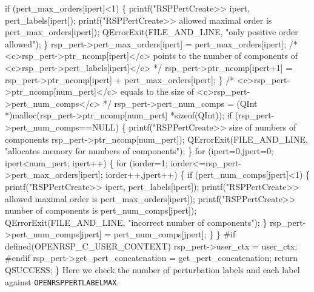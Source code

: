         if (pert_max_orders[ipert]<1) \{
            printf("RSPPertCreate>> %
                   ipert,
                   pert_labels[ipert]);
            printf("RSPPertCreate>> allowed maximal order is %
                   pert_max_orders[ipert]);
            QErrorExit(FILE_AND_LINE, "only positive order allowed");
        \}
        rsp_pert->pert_max_orders[ipert] = pert_max_orders[ipert];
        /* <c>rsp_pert->ptr_ncomp[ipert]</c> points to the number of components
           of <c>rsp_pert->pert_labels[ipert]</c> */
        rsp_pert->ptr_ncomp[ipert+1] = rsp_pert->ptr_ncomp[ipert]
                                     + pert_max_orders[ipert];
    \}
    /* <c>rsp_pert->ptr_ncomp[num_pert]</c> equals to the size of
       <c>rsp_pert->pert_num_comps</c> */
    rsp_pert->pert_num_comps = (QInt *)malloc(rsp_pert->ptr_ncomp[num_pert]
                                              *sizeof(QInt));
    if (rsp_pert->pert_num_comps==NULL) \{
        printf("RSPPertCreate>> size of numbers of components %
               rsp_pert->ptr_ncomp[num_pert]);
        QErrorExit(FILE_AND_LINE, "allocates memory for numbers of components");
    \}
    for (ipert=0,jpert=0; ipert<num_pert; ipert++) \{
        for (iorder=1; iorder<=rsp_pert->pert_max_orders[ipert]; iorder++,jpert++) \{
            if (pert_num_comps[jpert]<1) \{
                printf("RSPPertCreate>> %
                       ipert,
                       pert_labels[ipert]);
                printf("RSPPertCreate>> allowed maximal order is %
                       pert_max_orders[ipert]);
                printf("RSPPertCreate>> number of components is %
                       pert_num_comps[jpert]);
                QErrorExit(FILE_AND_LINE, "incorrect number of components");
            \}
            rsp_pert->pert_num_comps[jpert] = pert_num_comps[jpert];
        \}
    \}
#if defined(OPENRSP_C_USER_CONTEXT)
    rsp_pert->user_ctx = user_ctx;
#endif
    rsp_pert->get_pert_concatenation = get_pert_concatenation;
    return QSUCCESS;
\}
\nwendcode{}Here we check the number of perturbation labels and each label against
{\tt{}OPENRSP{}PERT{}LABEL{}MAX}.

